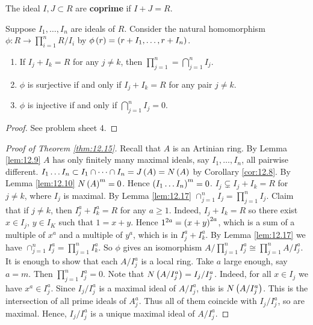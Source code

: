 \begin{definition}
The ideal $ I, J \subset R $ are \textbf{coprime} if $ I + J = R $.
\end{definition}

Suppose $ I_1, \dots, I_n $ are ideals of $ R $. Consider the natural homomorphism $ \phi : R \to \prod_{i = 1}^n R / I_i $ by $ \phi\left( r \right) = \left( r + I_1, \dots, r + I_n \right) $.

\begin{lemma}
\label{lem:12.17}
\hfill
\begin{enumerate}
\item If $ I_j + I_k = R $ for any $ j \ne k $, then $ \prod_{j = 1}^n = \bigcap_{j = 1}^n I_j $.
\item $ \phi $ is surjective if and only if $ I_j + I_k = R $ for any pair $ j \ne k $.
\item $ \phi $ is injective if and only if $ \bigcap_{j = 1}^n I_j = 0 $.
\end{enumerate}
\end{lemma}

\begin{proof}
See problem sheet 4.
\end{proof}

\begin{proof}[Proof of Theorem \ref{thm:12.15}]
Recall that $ A $ is an Artinian ring. By Lemma \ref{lem:12.9} $ A $ has only finitely many maximal ideals, say $ I_1, \dots, I_n $, all pairwise different. $ I_1 \dots I_n \subset I_1 \cap \dots \cap I_n = J\left( A \right) = N\left( A \right) $ by Corollary \ref{cor:12.8}. By Lemma \ref{lem:12.10} $ N\left( A \right)^m = 0 $. Hence $ \left( I_1 \dots I_n \right)^m = 0 $. $ I_j \subsetneq I_j + I_k = R $ for $ j \ne k $, where $ I_j $ is maximal. By Lemma \ref{lem:12.17} $ \cap_{j = 1}^n I_j = \prod_{j = 1}^n I_j $. Claim that if $ j \ne k $, then $ I_j^a + I_k^a = R $ for any $ a \ge 1 $. Indeed, $ I_j + I_k = R $ so there exist $ x \in I_j $, $ y \in I_K $ such that $ 1 = x + y $. Hence $ 1^{2a} = \left( x + y \right)^{2a} $, which is a sum of a multiple of $ x^a $ and a multiple of $ y^a $, which is in $ I_j^a + I_k^a $. By Lemma \ref{lem:12.17} we have $ \cap_{j = 1}^n I_j^a = \prod_{j = 1}^n I_k^a $. So $ \phi $ gives an isomorphism $ A / \prod_{j = 1}^n I_j^a \cong \prod_{j = 1}^n A / I_j^a $. It is enough to show that each $ A / I_j^a $ is a local ring. Take $ a $ large enough, say $ a = m $. Then $ \prod_{j = 1}^n I_j^a = 0 $. Note that $ N\left( A / I_j^a \right) = I_j / I_j^a $. Indeed, for all $ x \in I_j $ we have $ x^a \in I_j^a $. Since $ I_j / I_j^a $ is a maximal ideal of $ A / I_j^a $, this is $ N\left( A / I_j^a \right) $. This is the intersection of all prime ideals of $ A_j^a $. Thus all of them coincide with $ I_j / I_j^a $, so are maximal. Hence, $ I_j / I_j^a $ is a unique maximal ideal of $ A / I_j^a $.
\end{proof}

